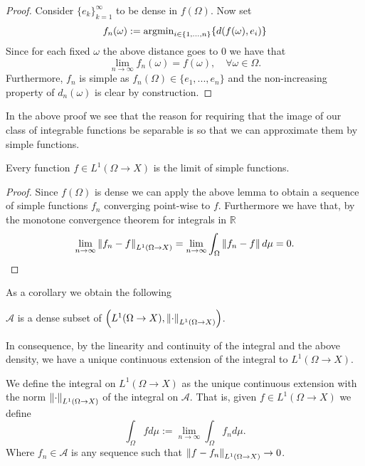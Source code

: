 \documentclass[
    a4paper,
    DIV=14,
    abstract=true,
    numbers=noenddot
]{scrartcl}
\begin{document}
\begin{proof}
	Consider $\{e_k\}_{k=1}^\infty$ to be dense in $f(\Omega)$. Now set
	\begin{equation*}
		f_n(\omega):= \rm{argmin}_{i\in\{1,...,n\}} \{d(f(\omega),e_i)\}
	\end{equation*}
	Since for each fixed $\omega$ the above distance goes to $0$ we have that
	\begin{equation*}
		\lim_{n\to\infty} f_n(\omega)=f(\omega),\quad \forall \omega\in\Omega.
	\end{equation*}
	Furthermore, $f_n$ is simple as $f_n(\Omega)\in \{e_1,...,e_n\}$ and the non-increasing property of $d_n(\omega)$ is clear by construction.
\end{proof}
In the above proof we see that the reason for requiring that the image of our class of integrable functions be separable is so that we can approximate them by simple functions.
\begin{proposition}
	Every function $f\in L^1(\Omega\to X)$ is the limit of simple functions.
\end{proposition}
\begin{proof}
	Since $f(\Omega)$ is dense we can apply the above lemma to obtain a sequence of simple functions $f_n$ converging point-wise to $f$. Furthermore we have that, by the monotone convergence theorem for integrals in $\mathbb{R}$
	\begin{equation*}
		\lim_{n\to\infty}\norm{f_n-f}_{L^1(\Omega\to X)}=\lim_{n\to\infty}\int_\Omega\norm{f_n-f}d\mu=0.
	\end{equation*}
\end{proof}
As a corollary we obtain the following
\begin{corollary}
	$\mathcal{A}$ is a dense subset of $\qty(L^1(\Omega\to X),\norm{\cdot}_{L^1(\Omega\to X)})$.
\end{corollary}
In consequence, by the linearity and continuity of the integral and the above density, we have a unique continuous extension of the integral to $L^1(\Omega\to X)$.
\begin{definition}
	We define the integral on $L^1(\Omega\to X)$ as the unique continuous extension with the norm $\norm{\cdot}_{L^1(\Omega\to X)}$ of the integral on $\mathcal{A}$. That is, given $f\in L^1(\Omega\to X)$ we define
	\begin{equation*}
		\int_\Omega f d\mu:=\lim_{n\to\infty} \int_\Omega f_n d\mu.
	\end{equation*}
	Where $f_n\in \mathcal{A}$ is any sequence such that $\norm{f-f_n}_{L^1(\Omega\to X)}\to 0$.
\end{definition}
\end{document}

